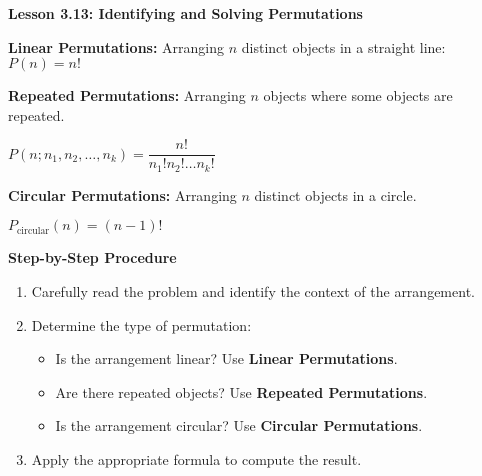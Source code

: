\begin{center}
\textbf{Lesson 3.13: Identifying and Solving Permutations}
\end{center}

\vspace*{-1.5ex}

\noindent \textbf{Linear Permutations:} Arranging \( n \) distinct objects in a straight line: \quad $ P(n) = n! $


\noindent \textbf{Repeated Permutations:} Arranging \( n \) objects where some objects are repeated.

{\centering $  P(n; n_1, n_2, \dots, n_k) = \dfrac{n!}{n_1!n_2!\dots n_k!} $\par}

\noindent \textbf{Circular Permutations:} Arranging \( n \) distinct objects in a circle.

{\centering $ 
    P_{\text{circular}}(n) = (n-1)!
 $\par}

\noindent\textbf{Step-by-Step Procedure}

\begin{enumerate}
    \item Carefully read the problem and identify the context of the arrangement.
    \item Determine the type of permutation:
    \begin{itemize}
        \item Is the arrangement linear? Use \textbf{Linear Permutations}.
        \item Are there repeated objects? Use \textbf{Repeated Permutations}.
        \item Is the arrangement circular? Use \textbf{Circular Permutations}.
    \end{itemize}
    \item Apply the appropriate formula to compute the result.
\end{enumerate}
